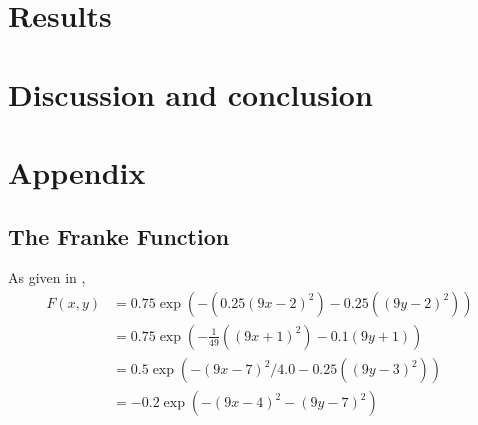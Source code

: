 \documentclass[11pt]{article}
\begin{document}
\section{Results}
\section{Discussion and conclusion}

\section{Appendix} \label{sec:appendix}
\subsection{The Franke Function}
As given in \cite{franke1979critical},
\begin{align}
    F(x,y) &= 0.75\exp\left(-\left(0.25\left(9x-2\right)^2\right) - 0.25\left(\left(9y-2\right)^2\right)\right) \\
    &= 0.75\exp\left(-\frac{1}{49}\left(\left(9x+1\right)^2\right) - 0.1\left(9y+1\right)\right) \\
    &= 0.5\exp\left(-\left(9x-7\right)^2/4.0 - 0.25\left(\left(9y-3\right)^2\right)\right) \\
    &= -0.2\exp\left(-\left(9x-4\right)^2 - \left(9y-7\right)^2\right)
    \label{eq:franke_function}
\end{align}



\end{document}
